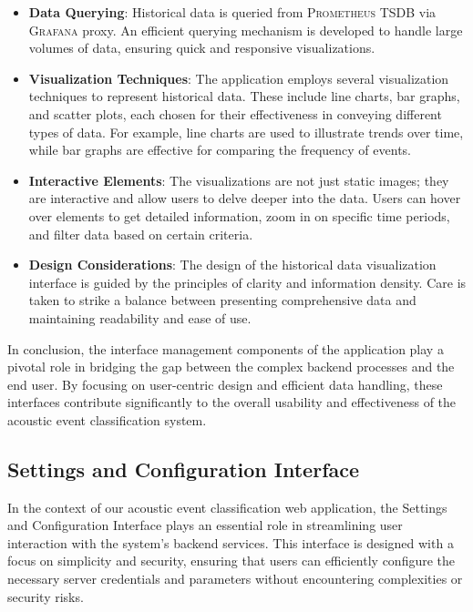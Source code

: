 \begin{itemize}
  \item \textbf{Data Querying}: Historical data is queried from \textsc{Prometheus} TSDB via \textsc{Grafana} proxy. An efficient querying mechanism is developed to handle large volumes of data, ensuring quick and responsive visualizations.
  \item \textbf{Visualization Techniques}: The application employs several visualization techniques to represent historical data. These include line charts, bar graphs, and scatter plots, each chosen for their effectiveness in conveying different types of data. For example, line charts are used to illustrate trends over time, while bar graphs are effective for comparing the frequency of events.
  \item \textbf{Interactive Elements}: The visualizations are not just static images; they are interactive and allow users to delve deeper into the data. Users can hover over elements to get detailed information, zoom in on specific time periods, and filter data based on certain criteria.
  \item \textbf{Design Considerations}: The design of the historical data visualization interface is guided by the principles of clarity and information density. Care is taken to strike a balance between presenting comprehensive data and maintaining readability and ease of use.
\end{itemize}

In conclusion, the interface management components of the application play a pivotal role in bridging the gap between the complex backend processes and the end user. By focusing on user-centric design and efficient data handling, these interfaces contribute significantly to the overall usability and effectiveness of the acoustic event classification system.

\subsection{Settings and Configuration Interface}
In the context of our acoustic event classification web application, the Settings and Configuration Interface plays an essential role in streamlining user interaction with the system's backend services. This interface is designed with a focus on simplicity and security, ensuring that users can efficiently configure the necessary server credentials and parameters without encountering complexities or security risks.

